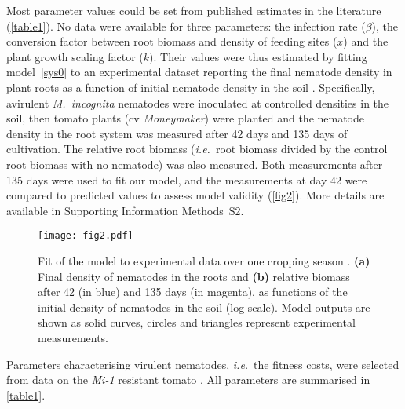 {{{{Most parameter values could be set from published estimates in the
literature (\autoref{table1}). No data were available for three
parameters: the infection rate ($\beta$), the conversion factor
between root biomass and density of feeding sites ($x$) and the plant
growth scaling factor ($k$). Their values were thus estimated by
fitting model~\eqref{sys0} to an experimental dataset reporting the
final nematode density in plant roots as a function of initial
nematode density in the soil \citep{Ehwaeti1998}. Specifically,
avirulent \textit{M.\ incognita} nematodes were inoculated at
controlled densities in the soil, then tomato plants (cv
\textit{Moneymaker}) were planted and the nematode density
in the root system was measured after 42 days and 135 days of
cultivation. The relative root biomass (\textit{i.e.}\ root biomass
divided by the control root biomass with no nematode) was also
measured. Both measurements after 135 days were used to fit our model,
and the measurements at day 42 were compared to predicted values to
assess model validity (\autoref{fig2}). More details are available in
Supporting Information Methods~S2.
\begin{figure}[ht]
  \centering
   \texttt{[image: fig2.pdf]} 
  \caption[Fit of the model to experimental data over one cropping
    season.]{Fit of the model to experimental data over one cropping
    season \citep{Ehwaeti1998}.  \textbf{(a)} Final density of
    nematodes in the roots and \textbf{(b)} relative biomass after 42
    (in blue) and 135 days (in magenta), as
    functions of the initial density of nematodes in the soil (log
    scale). Model outputs are shown as solid curves, circles and
    triangles represent experimental measurements.}
\label{fig2} 
\end{figure}

Parameters characterising virulent nematodes, \textit{i.e.}\ the fitness costs,  were selected from data on the \textit{Mi-1} resistant tomato  \citet{Castagnone-Sereno2007}. All parameters are summarised in \autoref{table1}.

}}}}
